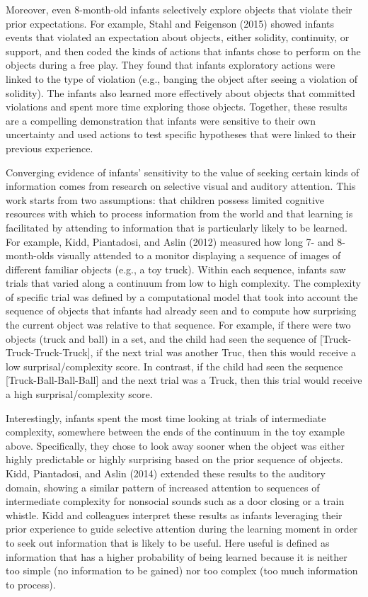 \documentclass[english,floatsintext,man]{apa6}
\theoremstyle{definition}
\theoremstyle{definition}
\theoremstyle{definition}
\theoremstyle{remark}
\begin{document}
Moreover, even 8-month-old infants selectively explore objects that
violate their prior expectations. For example, Stahl and Feigenson
(2015) showed infants events that violated an expectation about objects,
either solidity, continuity, or support, and then coded the kinds of
actions that infants chose to perform on the objects during a free play.
They found that infants exploratory actions were linked to the type of
violation (e.g., banging the object after seeing a violation of
solidity). The infants also learned more effectively about objects that
committed violations and spent more time exploring those objects.
Together, these results are a compelling demonstration that infants were
sensitive to their own uncertainty and used actions to test specific
hypotheses that were linked to their previous experience.

Converging evidence of infants' sensitivity to the value of seeking
certain kinds of information comes from research on selective visual and
auditory attention. This work starts from two assumptions: that children
possess limited cognitive resources with which to process information
from the world and that learning is facilitated by attending to
information that is particularly likely to be learned. For example,
Kidd, Piantadosi, and Aslin (2012) measured how long 7- and 8-month-olds
visually attended to a monitor displaying a sequence of images of
different familiar objects (e.g., a toy truck). Within each sequence,
infants saw trials that varied along a continuum from low to high
complexity. The complexity of specific trial was defined by a
computational model that took into account the sequence of objects that
infants had already seen and to compute how surprising the current
object was relative to that sequence. For example, if there were two
objects (truck and ball) in a set, and the child had seen the sequence
of {[}Truck-Truck-Truck-Truck{]}, if the next trial was another Truc,
then this would receive a low surprisal/complexity score. In contrast,
if the child had seen the sequence {[}Truck-Ball-Ball-Ball{]} and the
next trial was a Truck, then this trial would receive a high
surprisal/complexity score.

Interestingly, infants spent the most time looking at trials of
intermediate complexity, somewhere between the ends of the continuum in
the toy example above. Specifically, they chose to look away sooner when
the object was either highly predictable or highly surprising based on
the prior sequence of objects. Kidd, Piantadosi, and Aslin (2014)
extended these results to the auditory domain, showing a similar pattern
of increased attention to sequences of intermediate complexity for
nonsocial sounds such as a door closing or a train whistle. Kidd and
colleagues interpret these results as infants leveraging their prior
experience to guide selective attention during the learning moment in
order to seek out information that is likely to be useful. Here useful
is defined as information that has a higher probability of being learned
because it is neither too simple (no information to be gained) nor too
complex (too much information to process).
\end{document}
